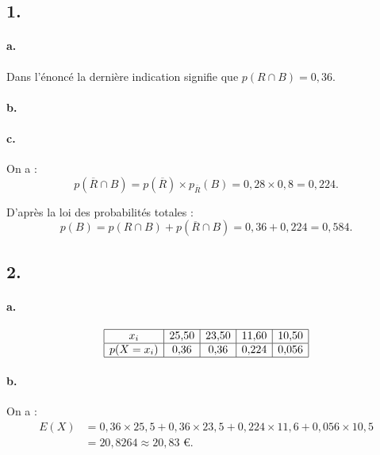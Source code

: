\subsection*{1.}

\paragraph{a.} Dans l'énoncé la dernière indication signifie que \(p(R \cap B) = 0{,}36\).

\paragraph{b.}

\begin{center}
\end{center}

\paragraph{c.} On a :
\[
p(\overline{R} \cap B) = p(\overline{R}) \times p_{\overline{R}}(B) = 0{,}28 \times 0{,}8 = 0{,}224.
\]

D'après la loi des probabilités totales :
\[
p(B) = p(R \cap B) + p(\overline{R} \cap B) = 0{,}36 + 0{,}224 = 0{,}584.
\]

\subsection*{2.}

\paragraph{a.}

\[
\begin{array}{|c|c|c|c|c|}
\hline
x_i & 25{,}50 & 23{,}50 & 11{,}60 & 10{,}50 \\
\hline
p(X = x_i) & 0{,}36 & 0{,}36 & 0{,}224 & 0{,}056 \\
\hline
\end{array}
\]

\paragraph{b.} On a :
\begin{align*}
E(X) &= 0{,}36 \times 25{,}5 + 0{,}36 \times 23{,}5 + 0{,}224 \times 11{,}6 + 0{,}056 \times 10{,}5 \\
&= 20{,}8264 \approx 20{,}83 \text{ €}.
\end{align*}
